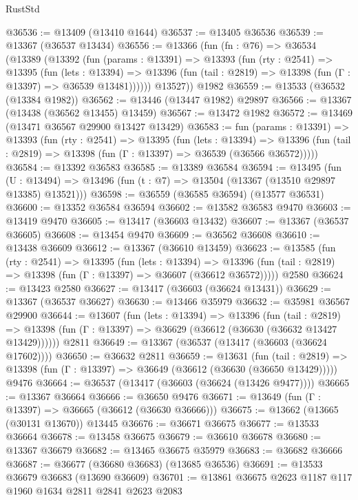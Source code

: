 \begin{lexlean}{RustStd}
\begin{coremodule}
@36536 := @13409 (@13410 @1644)
@36537 := @13405 @36536
@36539 := @13367 (@36537 @13434)
@36556 := @13366
    (fun (fn : @76) =>
    @36534
      (@13389
        (@13392
          (fun (params : @13391) =>
          @13393
            (fun (rty : @2541) =>
            @13395
              (fun (lets : @13394) =>
              @13396 (fun (tail : @2819) => @13398 (fun (Γ : @13397) => @36539 @13481))))))
        @13527))
    @1982
@36559 := @13533 (@36532 (@13384 @1982))
@36562 := @13446 (@13447 @1982) @29897
@36566 := @13367 (@13438 (@36562 @13455) @13459)
@36567 := @13472 @1982
@36572 := @13469 (@13471 @36567 @29900 @13427 @13429)
@36583 := fun (params : @13391) =>
  @13393
    (fun (rty : @2541) =>
    @13395
      (fun (lets : @13394) =>
      @13396 (fun (tail : @2819) => @13398 (fun (Γ : @13397) => @36539 (@36566 @36572)))))
@36584 := @13392 @36583
@36585 := @13389 @36584
@36594 := @13495
    (fun (U : @13494) => @13496 (fun (t : @7) => @13504 (@13367 (@13510 @29897 @13385) @13521)))
@36598 := @36559 (@36585 @36594) (@13577 @36531)
@36600 := @13352 @36584 @36594
@36602 := @13582 @36583 @9470
@36603 := @13419 @9470
@36605 := @13417 (@36603 @13432)
@36607 := @13367 (@36537 @36605)
@36608 := @13454 @9470
@36609 := @36562 @36608
@36610 := @13438 @36609
@36612 := @13367 (@36610 @13459)
@36623 := @13585
    (fun (rty : @2541) =>
    @13395
      (fun (lets : @13394) =>
      @13396 (fun (tail : @2819) => @13398 (fun (Γ : @13397) => @36607 (@36612 @36572)))))
    @2580
@36624 := @13423 @2580
@36627 := @13417 (@36603 (@36624 @13431))
@36629 := @13367 (@36537 @36627)
@36630 := @13466 @35979
@36632 := @35981 @36567 @29900
@36644 := @13607
    (fun (lets : @13394) =>
    @13396
      (fun (tail : @2819) =>
      @13398 (fun (Γ : @13397) => @36629 (@36612 (@36630 (@36632 @13427 @13429))))))
    @2811
@36649 := @13367 (@36537 (@13417 (@36603 (@36624 @17602))))
@36650 := @36632 @2811
@36659 := @13631
    (fun (tail : @2819) => @13398 (fun (Γ : @13397) => @36649 (@36612 (@36630 (@36650 @13429)))))
    @9476
@36664 := @36537 (@13417 (@36603 (@36624 (@13426 @9477))))
@36665 := @13367 @36664
@36666 := @36650 @9476
@36671 := @13649 (fun (Γ : @13397) => @36665 (@36612 (@36630 @36666)))
@36675 := @13662 (@13665 (@30131 @13670)) @13445
@36676 := @36671 @36675
@36677 := @13533 @36664
@36678 := @13458 @36675
@36679 := @36610 @36678
@36680 := @13367 @36679
@36682 := @13465 @36675 @35979
@36683 := @36682 @36666
@36687 := @36677 (@36680 @36683) (@13685 @36536)
@36691 := @13533 @36679 @36683 (@13690 @36609)
@36701 := @13861 @36675 @2623 @1187 @117 @1960 @1634 @2811 @2841 @2623 @2083

\end{coremodule}
\end{lexlean}
